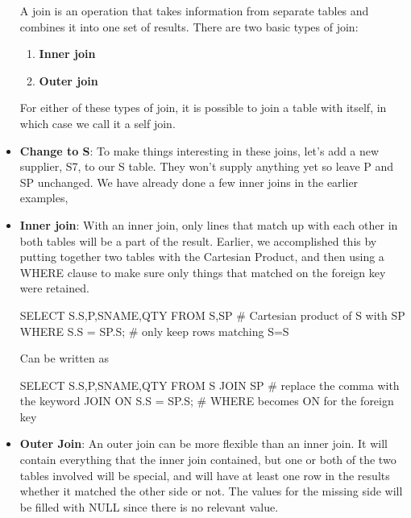 \documentclass{report}
\begin{document}
\begin{itemize}
            \bigbreak \noindent 
            A join is an operation that takes information from separate tables and combines it into one set of results.
            \bigbreak \noindent 
            There are two basic types of join:
            \begin{enumerate}
                \item \textbf{Inner join}
                \item \textbf{Outer join}
            \end{enumerate}
            For either of these types of join, it is possible to join a table with itself, in which case we call it a self join.
        \item \textbf{Change to S}: To make things interesting in these joins, let’s add a new supplier, S7, to our S table. They won’t supply anything yet so leave P and SP unchanged.
            \bigbreak \noindent 
            We have already done a few inner joins in the earlier examples,
            \bigbreak \noindent 
        \item \textbf{Inner join}: With an inner join, only lines that match up with each other in both tables will be a part of the result. Earlier, we accomplished this by putting together two tables with the Cartesian Product, and then using a WHERE clause to make sure only things that matched on the foreign key were retained.
            \bigbreak \noindent 
            \begin{sqlcode}
                SELECT S.S,P,SNAME,QTY
                    FROM S,SP # Cartesian product of S with SP
                    WHERE S.S = SP.S; # only keep rows matching S=S
            \end{sqlcode}
            \bigbreak \noindent 
            Can be written as
            \bigbreak \noindent 
            \begin{sqlcode}
            SELECT S.S,P,SNAME,QTY
                FROM S JOIN SP # replace the comma with the keyword JOIN
                ON S.S = SP.S; # WHERE becomes ON for the foreign key
            \end{sqlcode}
        \item \textbf{Outer Join}: An outer join can be more flexible than an inner join. It will contain everything that the inner join contained, but one or both of the two tables involved will be special, and will have at least one row in the results whether it matched the other side or not. The values for the missing side will be filled with NULL since there is no relevant value.
            \bigbreak \noindent 

\end{itemize}
\end{document}
